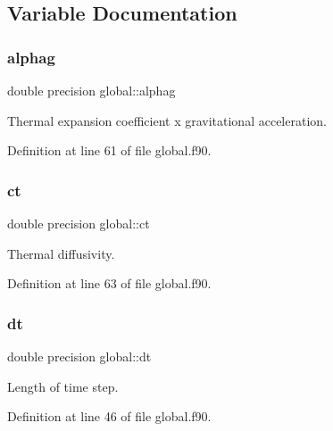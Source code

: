 \subsection{Variable Documentation}
\mbox{\label{namespaceglobal_abe54a711bf9d8c30a6debfb651bdf47d}} 
\subsubsection{\texorpdfstring{alphag}{alphag}}
{\footnotesize\ttfamily double precision global\+::alphag}



Thermal expansion coefficient x gravitational acceleration. 



Definition at line 61 of file global.\+f90.

\mbox{\label{namespaceglobal_acf5521de662915885b6a73718cd6314b}} 
\subsubsection{\texorpdfstring{ct}{ct}}
{\footnotesize\ttfamily double precision global\+::ct}



Thermal diffusivity. 



Definition at line 63 of file global.\+f90.

\mbox{\label{namespaceglobal_a24d27ecfb0e7d422997122c9345bac8b}} 
\subsubsection{\texorpdfstring{dt}{dt}}
{\footnotesize\ttfamily double precision global\+::dt}



Length of time step. 



Definition at line 46 of file global.\+f90.

\mbox{\label{namespaceglobal_a3c8fbc22da61f7188e79bad2b9ba1d16}} 
